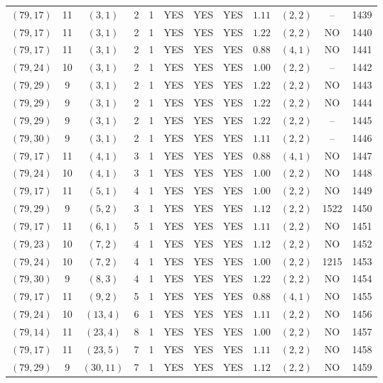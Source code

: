 \begin{longtable}{|c|c|c|c|c|c|c|c|c|c|c|c|}
$(79,17)$ & 11 & $(3,1)$ & 2 & 1 & YES & YES & YES & $1.11$ & $(2,2)$ & -- & 1439\\
$(79,17)$ & 11 & $(3,1)$ & 2 & 1 & YES & YES & YES & $1.22$ & $(2,2)$ & NO & 1440\\
$(79,17)$ & 11 & $(3,1)$ & 2 & 1 & YES & YES & YES & $0.88$ & $(4,1)$ & NO & 1441\\
$(79,24)$ & 10 & $(3,1)$ & 2 & 1 & YES & YES & YES & $1.00$ & $(2,2)$ & -- & 1442\\
$(79,29)$ & 9 & $(3,1)$ & 2 & 1 & YES & YES & YES & $1.22$ & $(2,2)$ & NO & 1443\\
$(79,29)$ & 9 & $(3,1)$ & 2 & 1 & YES & YES & YES & $1.22$ & $(2,2)$ & NO & 1444\\
$(79,29)$ & 9 & $(3,1)$ & 2 & 1 & YES & YES & YES & $1.22$ & $(2,2)$ & -- & 1445\\
$(79,30)$ & 9 & $(3,1)$ & 2 & 1 & YES & YES & YES & $1.11$ & $(2,2)$ & -- & 1446\\
$(79,17)$ & 11 & $(4,1)$ & 3 & 1 & YES & YES & YES & $0.88$ & $(4,1)$ & NO & 1447\\
$(79,24)$ & 10 & $(4,1)$ & 3 & 1 & YES & YES & YES & $1.00$ & $(2,2)$ & NO & 1448\\
$(79,17)$ & 11 & $(5,1)$ & 4 & 1 & YES & YES & YES & $1.00$ & $(2,2)$ & NO & 1449\\
$(79,29)$ & 9 & $(5,2)$ & 3 & 1 & YES & YES & YES & $1.12$ & $(2,2)$ & 1522 & 1450\\
$(79,17)$ & 11 & $(6,1)$ & 5 & 1 & YES & YES & YES & $1.11$ & $(2,2)$ & NO & 1451\\
$(79,23)$ & 10 & $(7,2)$ & 4 & 1 & YES & YES & YES & $1.12$ & $(2,2)$ & NO & 1452\\
$(79,24)$ & 10 & $(7,2)$ & 4 & 1 & YES & YES & YES & $1.00$ & $(2,2)$ & 1215 & 1453\\
$(79,30)$ & 9 & $(8,3)$ & 4 & 1 & YES & YES & YES & $1.22$ & $(2,2)$ & NO & 1454\\
$(79,17)$ & 11 & $(9,2)$ & 5 & 1 & YES & YES & YES & $0.88$ & $(4,1)$ & NO & 1455\\
$(79,24)$ & 10 & $(13,4)$ & 6 & 1 & YES & YES & YES & $1.11$ & $(2,2)$ & NO & 1456\\
$(79,14)$ & 11 & $(23,4)$ & 8 & 1 & YES & YES & YES & $1.00$ & $(2,2)$ & NO & 1457\\
$(79,17)$ & 11 & $(23,5)$ & 7 & 1 & YES & YES & YES & $1.11$ & $(2,2)$ & NO & 1458\\
$(79,29)$ & 9 & $(30,11)$ & 7 & 1 & YES & YES & YES & $1.12$ & $(2,2)$ & NO & 1459\\

\end{longtable}

